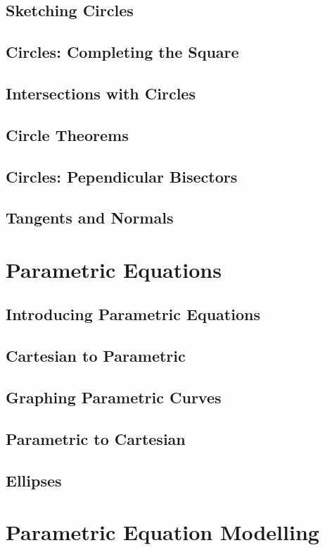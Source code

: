 \documentclass[../maths.tex]{subfiles}
\begin{document}
\subsection*{Sketching Circles}
\subsection*{Circles: Completing the Square}
\subsection*{Intersections with Circles}
\subsection*{Circle Theorems}
\subsection*{Circles: Pependicular Bisectors}
\subsection*{Tangents and Normals}
\section{Parametric Equations}
\subsection*{Introducing Parametric Equations}
\subsection*{Cartesian to Parametric}
\subsection*{Graphing Parametric Curves}
\subsection*{Parametric to Cartesian}
\subsection*{Ellipses}
\section{Parametric Equation Modelling}
\end{document}
